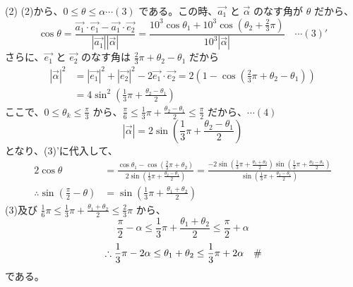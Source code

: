 \documentclass[../main.tex]{subfiles}
\begin{document}
(2) (2)から、$0 \le \theta \le \alpha \cdots (3)$ である。この時、$\overrightarrow{a_1}$ と $\overrightarrow{\alpha}$ のなす角が $\theta$ だから、
\[
\cos \theta = \frac{\overrightarrow{a_1} \cdot \overrightarrow{e_1} - \overrightarrow{a_1} \cdot \overrightarrow{e_2}}{|\overrightarrow{a_1}| |\overrightarrow{\alpha}|} = \frac{10^3 \cos \theta_1 + 10^3 \cos(\theta_2 + \frac{2}{3}\pi)}{10^3 |\overrightarrow{\alpha}|} \quad \cdots (3)'
\]
さらに、$\overrightarrow{e_1}$ と $\overrightarrow{e_2}$ のなす角は $\frac{2}{3}\pi + \theta_2 - \theta_1$ だから
\begin{align*}
|\overrightarrow{\alpha}|^2 &= |\overrightarrow{e_1}|^2 + |\overrightarrow{e_2}|^2 - 2 \overrightarrow{e_1} \cdot \overrightarrow{e_2} = 2(1 - \cos(\frac{2}{3}\pi + \theta_2 - \theta_1)) \\
&= 4 \sin^2 (\frac{1}{3}\pi + \frac{\theta_2 - \theta_1}{2})
\end{align*}
ここで、$0 \le \theta_k \le \frac{\pi}{3}$ から、$\frac{\pi}{6} \le \frac{1}{3}\pi + \frac{\theta_2 - \theta_1}{2} \le \frac{\pi}{2}$ だから、$\cdots (4)$
\[
|\overrightarrow{\alpha}| = 2 \sin(\frac{1}{3}\pi + \frac{\theta_2 - \theta_1}{2})
\]
となり、(3)'に代入して、
\begin{align*}
2 \cos \theta &= \frac{\cos \theta_1 - \cos(\frac{2}{3}\pi + \theta_2)}{2 \sin(\frac{1}{3}\pi + \frac{\theta_2 - \theta_1}{2})} = \frac{-2 \sin(\frac{1}{3}\pi + \frac{\theta_1 + \theta_2}{2}) \sin(\frac{1}{3}\pi + \frac{\theta_2 - \theta_1}{2})}{\sin(\frac{1}{3}\pi + \frac{\theta_2 - \theta_1}{2})} \\
\therefore \sin(\frac{\pi}{2} - \theta) &= \sin(\frac{1}{3}\pi + \frac{\theta_1 + \theta_2}{2})
\end{align*}
(3)及び $\frac{1}{6}\pi \le \frac{1}{3}\pi + \frac{\theta_1 + \theta_2}{2} \le \frac{2}{3}\pi$ から、
\[
\frac{\pi}{2} - \alpha \le \frac{1}{3}\pi + \frac{\theta_1 + \theta_2}{2} \le \frac{\pi}{2} + \alpha
\]
\[
\therefore \frac{1}{3}\pi - 2\alpha \le \theta_1 + \theta_2 \le \frac{1}{3}\pi + 2\alpha \quad \text{\#\!}
\]
である。
\end{document}
